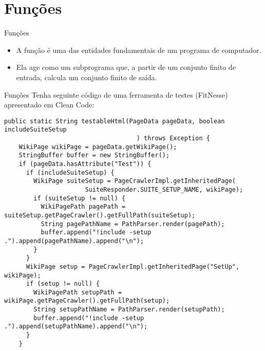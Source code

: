 \documentclass[11pt]{beamer}
\begin{document}
  \section{Funções}

  \begin{frame}{Funções}
    \begin{itemize}
      \item A função é uma das entidades fundamentais de um programa de computador.
      \item Ela age como um subprograma que, a partir de um conjunto finito de entrada, calcula um conjunto finito de saída.
    \end{itemize}
  \end{frame}

  \begin{frame}[fragile]{Funções}
    Tenha seguinte código de uma ferramenta de testes (FitNesse) apresentado em Clean Code:

    \begin{lstlisting}[basicstyle=\tiny]
  public static String testableHtml(PageData pageData, boolean includeSuiteSetup
                                    ) throws Exception {
    WikiPage wikiPage = pageData.getWikiPage();
    StringBuffer buffer = new StringBuffer();
    if (pageData.hasAttribute("Test")) {
      if (includeSuiteSetup) {
        WikiPage suiteSetup = PageCrawlerImpl.getInheritedPage(
                      SuiteResponder.SUITE_SETUP_NAME, wikiPage);
        if (suiteSetup != null) {
          WikiPagePath pagePath = suiteSetup.getPageCrawler().getFullPath(suiteSetup);
          String pagePathName = PathParser.render(pagePath);
          buffer.append("!include -setup .").append(pagePathName).append("\n");
        }
      }
      WikiPage setup = PageCrawlerImpl.getInheritedPage("SetUp", wikiPage);
      if (setup != null) {
        WikiPagePath setupPath = wikiPage.getPageCrawler().getFullPath(setup);
        String setupPathName = PathParser.render(setupPath);
        buffer.append("!include -setup .").append(setupPathName).append("\n");
      }
    }
    \end{lstlisting}
  \end{frame}
\end{document}
